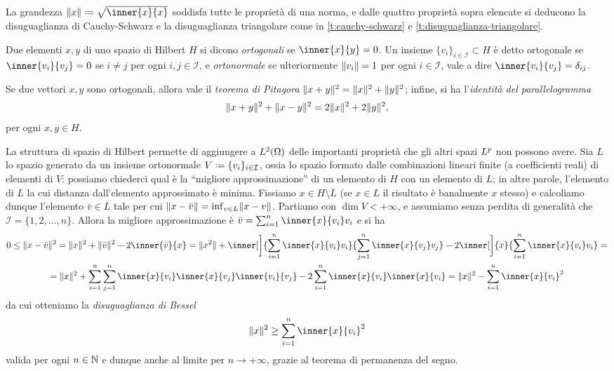 La grandezza $\norm{x}\defeq\sqrt{\inner{x}{x}}$ soddisfa tutte le proprietà di una norma, e dalle quattro proprietà sopra elencate si deducono la disuguaglianza di Cauchy-Schwarz e la disuguaglianza triangolare come in \ref{t:cauchy-schwarz} e \ref{t:disuguaglianza-triangolare}.
\begin{definizione} \label{d:ortogonalita}
    Due elementi $x,y$ di uno spazio di Hilbert $H$ si dicono \emph{ortogonali} se $\inner{x}{y}=0$.
    Un insieme $\{v_i\}_{i\in\mathcal{I}}\subset H$ è detto ortogonale se $\inner{v_i}{v_j}=0$ se $i\ne j$ per ogni $i,j\in\mathcal{I}$, e \emph{ortonormale} se ulteriormente $\norm{v_i}=1$ per ogni $i\in\mathcal{I}$, vale a dire $\inner{v_i}{v_j}=\delta_{ij}$.
\end{definizione}
Se due vettori $x,y$ sono ortogonali, allora vale il \emph{teorema di Pitagora} $\norm{x+y}^2=\norm{x}^2+\norm{y}^2$; infine, si ha l'\emph{identità del parallelogramma}
\begin{equation}
    \norm{x+y}^2+\norm{x-y}^2=2\norm{x}^2+2\norm{y}^2,
    \label{eq:identita-parallelogramma}
\end{equation}
per ogni $x,y\in H$.

La struttura di spazio di Hilbert permette di aggiungere a $\leb[2]{\Omega}$ delle importanti proprietà che gli altri spazi $\lclass[p]$ non possono avere.
Sia $L$ lo spazio generato da un insieme ortonormale $V\defeq\{v_i\}_{i\in\mathcal{I}}$, ossia lo spazio formato dalle combinazioni lineari finite (a coefficienti reali) di elementi di $V$: possiamo chiederci qual è la ``migliore approssimazione'' di un elemento di $H$ con un elemento di $L$; in altre parole, l'elemento di $L$ la cui distanza dall'elemento approssimato è minima.
Fissiamo $x\in H\setminus L$ (se $x\in L$ il risultato è banalmente $x$ stesso) e calcoliamo dunque l'elemento $\bar{v}\in L$ tale per cui $\norm{x-\bar{v}}=\inf_{v\in L}\norm{x-v}$.
Partiamo con $\dim V<+\infty$, e assumiamo senza perdita di generalità che $\mathcal{I}=\{1,2,\dotsc,n\}$.
Allora la migliore approssimazione è $\bar{v}=\sum_{i=1}^n\inner{x}{v_i}v_i$ e si ha
\begin{multline}
    0\le
    \norm{x-\bar{v}}^2=
    \norm{x}^2+\norm{\bar{v}}^2-2\inner{\bar{v}}{x}=
    \norm{x^2}+\inner[\bigg]{\sum_{i=1}^n\inner{x}{v_i}v_i}{\sum_{j=1}^n\inner{x}{v_j}v_j}-2\inner[\bigg]{x}{\sum_{i=1}^n\inner{x}{v_i}v_i}=\\=
    \norm{x}^2+\sum_{i=1}^n\sum_{j=1}^n\inner{x}{v_i}\inner{x}{v_j}\inner{v_i}{v_j}-2\sum_{i=1}^n\inner{x}{v_i}\inner{x}{v_i}=
    \norm{x}^2-\sum_{i=1}^n\inner{x}{v_i}^2
\end{multline}
da cui otteniamo la \emph{disuguaglianza di Bessel}
\begin{equation}
    \norm{x}^2\ge\sum_{i=1}^n\inner{x}{v_i}^2
    \label{eq:disuguaglianza-bessel}
\end{equation}
valida per ogni $n\in\N$ e dunque anche al limite per $n\to+\infty$, grazie al teorema di permanenza del segno.

